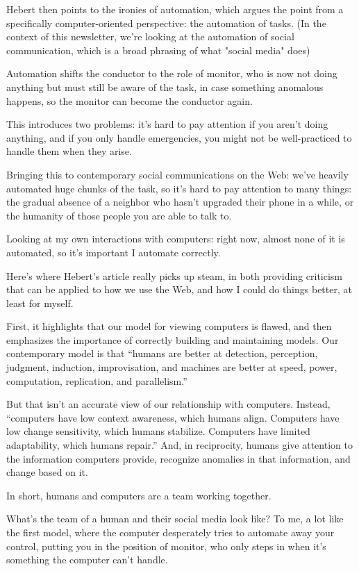 \documentclass[11pt]{article}
\begin{document}
\begin{itemize}
Hebert then points to the ironies of automation, which argues the point from a specifically computer-oriented perspective: the automation of tasks. (In the context of this newsletter, we're looking at the automation of social communication, which is a broad phrasing of what "social media" does)

Automation shifts the conductor to the role of monitor, who is now not doing anything but must still be aware of the task, in case something anomalous happens, so the monitor can become the conductor again.

This introduces two problems: it's hard to pay attention if you aren't doing anything, and if you only handle emergencies, you might not be well-practiced to handle them when they arise.

Bringing this to contemporary social communications on the Web: we've heavily automated huge chunks of the task, so it's hard to pay attention to many things: the gradual absence of a neighbor who hasn't upgraded their phone in a while, or the humanity of those people you are able to talk to.

Looking at my own interactions with computers: right now, almost none of it is automated, so it's important I automate correctly.

Here's where Hebert's article really picks up steam, in both providing criticism that can be applied to how we use the Web, and how I could do things better, at least for myself.

First, it highlights that our model for viewing computers is flawed, and then emphasizes the importance of correctly building and maintaining models. Our contemporary model is that “humans are better at detection, perception, judgment, induction, improvisation, and machines are better at speed, power, computation, replication, and parallelism.”

But that isn’t an accurate view of our relationship with computers. Instead, “computers have low context awareness, which humans align. Computers have low change sensitivity, which humans stabilize. Computers have limited adaptability, which humans repair.” And, in reciprocity, humans give attention to the information computers provide, recognize anomalies in that information, and change based on it.

In short, humans and computers are a team working together.

What’s the team of a human and their social media look like? To me, a lot like the first model, where the computer desperately tries to automate away your control, putting you in the position of monitor, who only steps in when it’s something the computer can’t handle.


\end{itemize}
\end{document}
